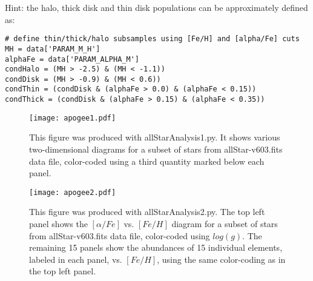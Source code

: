 Hint: the halo, thick disk and thin disk populations can be approximately defined as:
\begin{verbatim}
# define thin/thick/halo subsamples using [Fe/H] and [alpha/Fe] cuts
MH = data['PARAM_M_H']
alphaFe = data['PARAM_ALPHA_M']
condHalo = (MH > -2.5) & (MH < -1.1))
condDisk = (MH > -0.9) & (MH < 0.6))
condThin = (condDisk & (alphaFe > 0.0) & (alphaFe < 0.15)) 
condThick = (condDisk & (alphaFe > 0.15) & (alphaFe < 0.35)) 
\end{verbatim}






\begin{figure}
  \centering
  \texttt{[image: apogee1.pdf]}
  \vskip -1.5in
  \caption{
    This figure was produced with allStarAnalysis1.py. It shows various two-dimensional diagrams  
    for a subset of stars from allStar-v603.fits data file, color-coded using a third quantity marked
    below each panel. 
  }
  \label{basic_example1}
\end{figure}


\begin{figure}
  \centering
  \texttt{[image: apogee2.pdf]}
  \vskip -1.5in
  \caption{
    This figure was produced with allStarAnalysis2.py. The top left panel shows the $[\alpha/Fe]$ vs. 
$[Fe/H]$ diagram for a subset of stars from allStar-v603.fits data file, color-coded using $log(g)$. 
The remaining 15 panels show the abundances of 15 individual elements, labeled in each panel, 
vs. $[Fe/H]$, using the same color-coding as in the top left panel. 
  }
  \label{basic_example2}
\end{figure}

